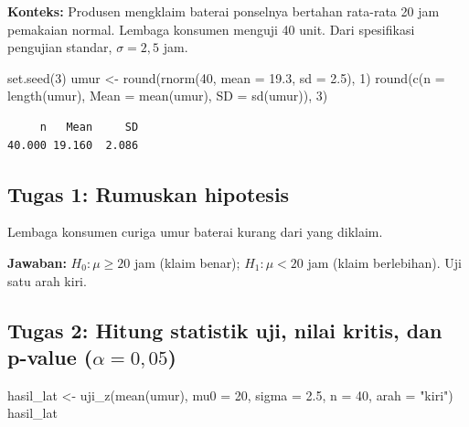 \documentclass[
  indonesian,
  letterpaper,
]{book}
\newenvironment{Shaded}{\begin{snugshade}}{\end{snugshade}}
\newcommand{\AttributeTok}[1]{\textcolor[rgb]{0.40,0.45,0.13}{#1}}
\newcommand{\DecValTok}[1]{\textcolor[rgb]{0.68,0.00,0.00}{#1}}
\newcommand{\FloatTok}[1]{\textcolor[rgb]{0.68,0.00,0.00}{#1}}
\newcommand{\FunctionTok}[1]{\textcolor[rgb]{0.28,0.35,0.67}{#1}}
\newcommand{\NormalTok}[1]{\textcolor[rgb]{0.00,0.23,0.31}{#1}}
\newcommand{\OtherTok}[1]{\textcolor[rgb]{0.00,0.23,0.31}{#1}}
\newcommand{\StringTok}[1]{\textcolor[rgb]{0.13,0.47,0.30}{#1}}
\begin{document}
\textbf{Konteks:} Produsen mengklaim baterai ponselnya bertahan
rata-rata 20 jam pemakaian normal. Lembaga konsumen menguji 40 unit.
Dari spesifikasi pengujian standar, \(\sigma = 2{,}5\) jam.

\begin{Shaded}
\begin{Highlighting}[]
\FunctionTok{set.seed}\NormalTok{(}\DecValTok{3}\NormalTok{)}
\NormalTok{umur }\OtherTok{\textless{}{-}} \FunctionTok{round}\NormalTok{(}\FunctionTok{rnorm}\NormalTok{(}\DecValTok{40}\NormalTok{, }\AttributeTok{mean =} \FloatTok{19.3}\NormalTok{, }\AttributeTok{sd =} \FloatTok{2.5}\NormalTok{), }\DecValTok{1}\NormalTok{)}
\FunctionTok{round}\NormalTok{(}\FunctionTok{c}\NormalTok{(}\AttributeTok{n =} \FunctionTok{length}\NormalTok{(umur), }\AttributeTok{Mean =} \FunctionTok{mean}\NormalTok{(umur), }\AttributeTok{SD =} \FunctionTok{sd}\NormalTok{(umur)), }\DecValTok{3}\NormalTok{)}
\end{Highlighting}
\end{Shaded}

\begin{verbatim}
     n   Mean     SD 
40.000 19.160  2.086 
\end{verbatim}

\subsection{Tugas 1: Rumuskan
hipotesis}\label{tugas-1-rumuskan-hipotesis}

Lembaga konsumen curiga umur baterai kurang dari yang diklaim.

\textbf{Jawaban:} \(H_0: \mu \geq 20\) jam (klaim benar);
\(H_1: \mu < 20\) jam (klaim berlebihan). Uji satu arah kiri.

\subsection{\texorpdfstring{Tugas 2: Hitung statistik uji, nilai kritis,
dan p-value
(\(\alpha = 0{,}05\))}{Tugas 2: Hitung statistik uji, nilai kritis, dan p-value (\textbackslash alpha = 0\{,\}05)}}\label{tugas-2-hitung-statistik-uji-nilai-kritis-dan-p-value-alpha-005}

\begin{Shaded}
\begin{Highlighting}[]
\NormalTok{hasil\_lat }\OtherTok{\textless{}{-}} \FunctionTok{uji\_z}\NormalTok{(}\FunctionTok{mean}\NormalTok{(umur), }\AttributeTok{mu0 =} \DecValTok{20}\NormalTok{, }\AttributeTok{sigma =} \FloatTok{2.5}\NormalTok{, }\AttributeTok{n =} \DecValTok{40}\NormalTok{, }\AttributeTok{arah =} \StringTok{"kiri"}\NormalTok{)}
\NormalTok{hasil\_lat}
\end{Highlighting}
\end{Shaded}
\end{document}
